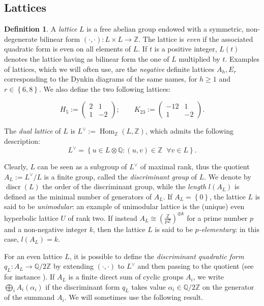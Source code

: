 \documentclass{amsart}
\theoremstyle{definition}
\newtheorem{defi}[theorem]{Definition}
\newcommand{\ra}{\rightarrow}
\newcommand{\IZ}{\mathbb{Z}}
\newcommand{\IQ}{\mathbb{Q}}
\newcommand{\coloneqq}{:=}
\DeclareMathOperator{\discr}{discr}
\DeclareMathOperator{\Hom}{Hom}
\begin{document}
\subsection{Lattices}\label{lattices}
\begin{defi}
A \emph{lattice} $L$ is a free abelian group endowed with a symmetric, non-degenerate bilinear form $(\cdot,\cdot): L \times L \ra \IZ$. The lattice is \emph{even} if the associated quadratic form is even on all elements of $L$.
If $t$ is a positive integer, $L(t)$ denotes the lattice having as bilinear form the one of $L$ multiplied by $t$. Examples of lattices, which we will often use, are the \emph{negative} definite lattices $A_h, E_r$ corresponding to the Dynkin diagrams of the same names, for $h \geq 1$ and $r \in \left\{ 6, 8 \right\}$. We also define the two following lattices:

\[ H_5 \coloneqq \begin{pmatrix}
2 & 1\\
1 & -2
\end{pmatrix}; \qquad 
K_{23} \coloneqq \begin{pmatrix}
-12 & 1\\
1 & -2
\end{pmatrix}.\]

The \emph{dual lattice} of $L$ is $L^\vee \coloneqq \Hom_ {\IZ}(L, \IZ)$, which admits the following description:
\[L^\vee = \left\{ u \in L \otimes \IQ : (u,v) \in \IZ \;\; \forall v \in L \right\}. \]
\end{defi}

Clearly, $L$ can be seen as a subgroup of $L^\vee$ of maximal rank, thus the quotient $A_L \coloneqq L^\vee / L$ is a finite group, called the \emph{discriminant group} of $L$. We denote by $\discr(L)$ the order of the discriminant group, while the \emph{length} $l(A_L)$ is defined as the minimal number of generators of $A_L$. If $A_L = \left\{ 0\right\}$, the lattice $L$ is said to be \emph{unimodular}: an example of unimodular lattice is the (unique) even hyperbolic lattice $U$ of rank two. If instead $A_L \cong \left( \frac{\IZ}{p\IZ}\right)^{\oplus k}$ for a prime number $p$ and a non-negative integer $k$, then the lattice $L$ is said to be \emph{$p$-elementary}: in this case, $l(A_L) = k$.

For an even lattice $L$, it is possible to define the \emph{discriminant quadratic form} $q_L: A_L \ra \IQ/2\IZ$ by extending $(\cdot, \cdot)$ to $L^\vee$ and then passing to the quotient (see for instance \cite[\S 1.2]{dolgachev}). If $A_L$ is a finite direct sum of cyclic groups $A_i$, we write $ \bigoplus_i A_i(\alpha_i)$ if the discriminant form $q_L$ takes value $\alpha_i \in \IQ/2\IZ$ on the generator of the summand $A_i$. We will sometimes use the following result.
\end{document}
